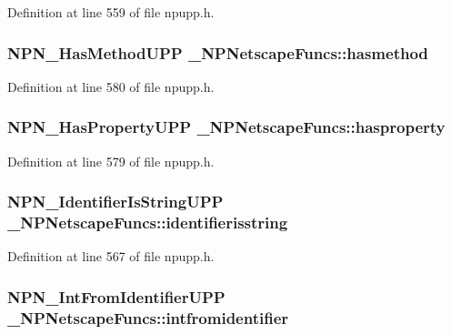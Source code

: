 Definition at line 559 of file npupp.h.

\hypertarget{struct___n_p_netscape_funcs_afcbe130a9fd1f9fbec374b28e485035a}{
\subsubsection[{hasmethod}]{\setlength{\rightskip}{0pt plus 5cm}NPN\_\-HasMethodUPP {\bf \_\-NPNetscapeFuncs::hasmethod}}}
\label{struct___n_p_netscape_funcs_afcbe130a9fd1f9fbec374b28e485035a}


Definition at line 580 of file npupp.h.

\hypertarget{struct___n_p_netscape_funcs_aedfb4f76b683b697d87a1c0ba8c97c5d}{
\subsubsection[{hasproperty}]{\setlength{\rightskip}{0pt plus 5cm}NPN\_\-HasPropertyUPP {\bf \_\-NPNetscapeFuncs::hasproperty}}}
\label{struct___n_p_netscape_funcs_aedfb4f76b683b697d87a1c0ba8c97c5d}


Definition at line 579 of file npupp.h.

\hypertarget{struct___n_p_netscape_funcs_a7f1e30538e4d3869f932baec501978fc}{
\subsubsection[{identifierisstring}]{\setlength{\rightskip}{0pt plus 5cm}NPN\_\-IdentifierIsStringUPP {\bf \_\-NPNetscapeFuncs::identifierisstring}}}
\label{struct___n_p_netscape_funcs_a7f1e30538e4d3869f932baec501978fc}


Definition at line 567 of file npupp.h.

\hypertarget{struct___n_p_netscape_funcs_a8faaf389bec059a0f491051ea964cdb9}{
\subsubsection[{intfromidentifier}]{\setlength{\rightskip}{0pt plus 5cm}NPN\_\-IntFromIdentifierUPP {\bf \_\-NPNetscapeFuncs::intfromidentifier}}}
\label{struct___n_p_netscape_funcs_a8faaf389bec059a0f491051ea964cdb9}


